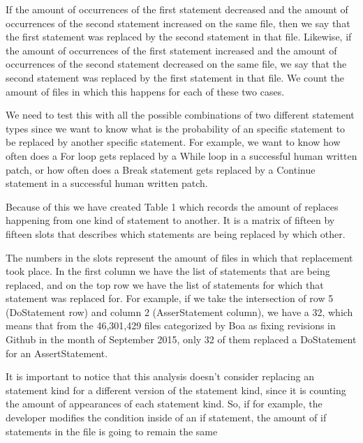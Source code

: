 \documentclass{sig-alternate-05-2015}
\begin{document}
If the amount of occurrences of the first statement decreased and the amount of occurrences  of the second statement increased on the same file, then we say that the first statement was replaced by the second statement in that file. Likewise, if the amount of occurrences of the first statement increased and the amount of occurrences  of the second statement decreased on the same file, we say that the second statement was replaced by the first statement in that file. We count the amount of files in which this happens for each of these two cases.

We need to test this with all the possible combinations of two different statement types since we want to know what is the probability of an specific statement to be replaced by another specific statement. For example, we want to know how often does a For loop gets replaced by a While loop in a successful human written patch, or how often does a Break statement gets replaced by a Continue statement in a successful human written patch.

Because of this we have created Table 1 which records the amount of replaces happening from one kind of statement to another. It is a matrix of fifteen by fifteen slots that describes which statements are being replaced by which other. 

The numbers in the slots represent the amount of files in which that replacement took place. In the first column we have the list of statements that are being replaced, and on the top row we have the list of statements for which that statement was replaced for. For example, if we take the intersection of row 5 (DoStatement row) and column 2 (AsserStatement column), we have a 32, which means that from the 46,301,429 files categorized by Boa as fixing revisions in Github in the month of September 2015, only 32 of them replaced a DoStatement for an AssertStatement.

It is important to notice  that this analysis doesn't consider replacing an statement kind for a different version of the statement kind, since it is counting the amount of appearances of each statement kind. So, if for example, the developer modifies the condition inside of an if statement, the amount of if statements in the file is going to remain the same
\end{document}
